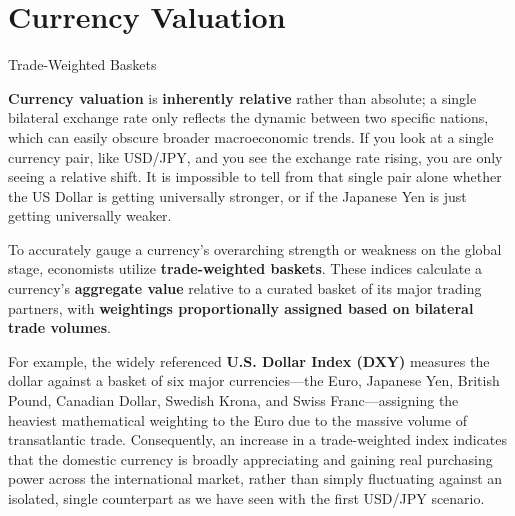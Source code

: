 \documentclass[10pt]{article}
\begin{document}
\section{Currency Valuation}

  \begin{core}{Trade-Weighted Baskets}

    \textbf{Currency valuation} is \textbf{inherently relative} rather than absolute; a single bilateral exchange rate only reflects the dynamic between two specific nations, which can easily obscure broader macroeconomic trends. If you look at a single currency pair, like USD/JPY, and you see the exchange rate rising, you are only seeing a relative shift. It is impossible to tell from that single pair alone whether the US Dollar is getting universally stronger, or if the Japanese Yen is just getting universally weaker.

    To accurately gauge a currency's overarching strength or weakness on the global stage, economists utilize \textbf{trade-weighted baskets}. These indices calculate a currency's \textbf{aggregate value} relative to a curated basket of its major trading partners, with \textbf{weightings proportionally assigned based on bilateral trade volumes}. 


    For example, the widely referenced \textbf{U.S. Dollar Index (DXY)} measures the dollar against a basket of six major currencies---the Euro, Japanese Yen, British Pound, Canadian Dollar, Swedish Krona, and Swiss Franc---assigning the heaviest mathematical weighting to the Euro due to the massive volume of transatlantic trade. Consequently, an increase in a trade-weighted index indicates that the domestic currency is broadly appreciating and gaining real purchasing power across the international market, rather than simply fluctuating against an isolated, single counterpart as we have seen with the first USD/JPY scenario.

  \end{core}
\end{document}
